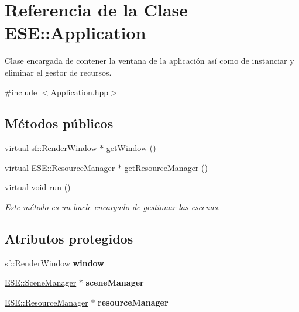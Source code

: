 \hypertarget{class_e_s_e_1_1_application}{\section{Referencia de la Clase E\-S\-E\-:\-:Application}
\label{class_e_s_e_1_1_application}
}


Clase encargada de contener la ventana de la aplicación así como de instanciar y eliminar el gestor de recursos.  




{\ttfamily \#include $<$Application.\-hpp$>$}

\subsection*{Métodos públicos}
\begin{DoxyCompactItemize}
\item 
virtual sf\-::\-Render\-Window $\ast$ \hyperlink{class_e_s_e_1_1_application_ad75de64e8ea0b96e0d51b843754ec12b}{get\-Window} ()
\item 
virtual \hyperlink{class_e_s_e_1_1_resource_manager}{E\-S\-E\-::\-Resource\-Manager} $\ast$ \hyperlink{class_e_s_e_1_1_application_ac4b22a0cd6f1a47406f34a742e4fb4a1}{get\-Resource\-Manager} ()
\item 
\hypertarget{class_e_s_e_1_1_application_ae40ddf6b4877fcbc34744340b303c5d4}{virtual void \hyperlink{class_e_s_e_1_1_application_ae40ddf6b4877fcbc34744340b303c5d4}{run} ()}\label{class_e_s_e_1_1_application_ae40ddf6b4877fcbc34744340b303c5d4}

\begin{DoxyCompactList}\small\item\em Este método es un bucle encargado de gestionar las escenas. \end{DoxyCompactList}\end{DoxyCompactItemize}
\subsection*{Atributos protegidos}
\begin{DoxyCompactItemize}
\item 
\hypertarget{class_e_s_e_1_1_application_a4fb8cca666cc5aca33eea86fcddb23a0}{sf\-::\-Render\-Window {\bfseries window}}\label{class_e_s_e_1_1_application_a4fb8cca666cc5aca33eea86fcddb23a0}

\item 
\hypertarget{class_e_s_e_1_1_application_acd0b33135b8e1964d2d3fecb9c4a5da5}{\hyperlink{class_e_s_e_1_1_scene_manager}{E\-S\-E\-::\-Scene\-Manager} $\ast$ {\bfseries scene\-Manager}}\label{class_e_s_e_1_1_application_acd0b33135b8e1964d2d3fecb9c4a5da5}

\item 
\hypertarget{class_e_s_e_1_1_application_a0e5373d2405b732999ae58a4786773a2}{\hyperlink{class_e_s_e_1_1_resource_manager}{E\-S\-E\-::\-Resource\-Manager} $\ast$ {\bfseries resource\-Manager}}\label{class_e_s_e_1_1_application_a0e5373d2405b732999ae58a4786773a2}

\end{DoxyCompactItemize}


